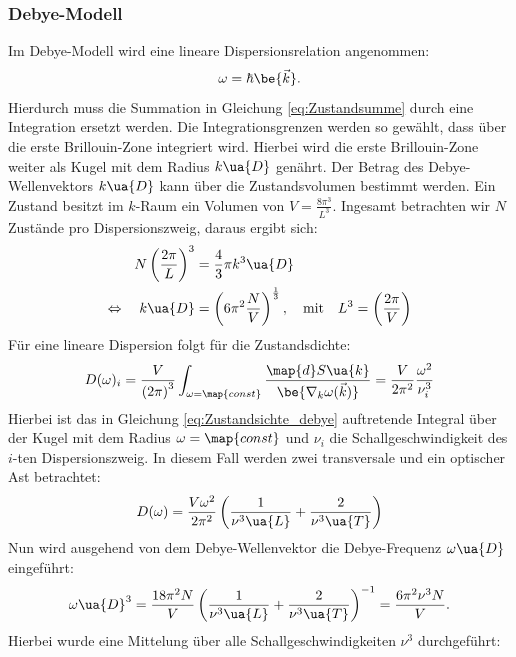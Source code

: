 \subsubsection{Debye-Modell}
Im Debye-Modell wird eine lineare Dispersionsrelation angenommen:
\begin{equation*}
   \omega = \hbar \be{\vec{k}}.
\end{equation*}
Hierdurch muss die Summation in Gleichung \eqref{eq:Zustandsumme} durch eine
Integration ersetzt werden. Die Integrationsgrenzen werden so gewählt, dass über die
erste Brillouin-Zone integriert wird. Hierbei wird die erste Brillouin-Zone
weiter als Kugel mit dem Radius $k\ua{D}$ genährt. Der Betrag des Debye-Wellenvektors
$k\ua{D}$ kann über die Zustandsvolumen bestimmt werden. Ein Zustand besitzt im $k$-Raum
ein Volumen von $V=\frac{8\pi^3}{L^3}$. Ingesamt betrachten wir $N$ Zustände pro
Dispersionszweig, daraus ergibt sich:
\begin{align*}
  N\left(\frac{2\pi}{L}\right)^3 &= \frac{4}{3}\pi k^3\ua{D} \\
  \Leftrightarrow \quad k\ua{D}&=\left(6\pi^2 \frac{N}{V}\right)^{\frac{1}{3}}, \quad \text{mit} \quad L^3 = \left(\frac{2\pi}{V}\right)
\end{align*}
Für eine lineare Dispersion folgt für die Zustandsdichte:
\begin{equation}
  \label{eq:Zustandsichte_debye}
D(\omega)_i = \frac{V}{\left(2\pi\right)^3} \int_{\omega=\map{const}} \frac{\map{d}S\ua{k}}{\be{\nabla_k \omega(\vec{k})}}= \frac{V}{2\pi^2}\frac{\omega^2}{\nu_i^3}
\end{equation}
Hierbei ist das in Gleichung \eqref{eq:Zustandsichte_debye} auftretende Integral
über der Kugel mit dem Radius $\omega=\map{const}$ und $\nu_i$ die Schallgeschwindigkeit
des $i$-ten Dispersionszweig. In diesem Fall werden zwei transversale und ein optischer
Ast betrachtet:
\begin{equation}
  \label{eq:Zustandsdichte_all_togther}
  D(\omega) = \frac{V \omega^2}{2\pi^2} \left(\frac{1}{\nu^3\ua{L}} + \frac{2}{\nu^3\ua{T}}\right)
\end{equation}
Nun wird ausgehend von dem Debye-Wellenvektor die Debye-Frequenz $\omega\ua{D}$ eingeführt:
\begin{equation}
  \label{eq:Debye_freuqenz}
  \omega\ua{D}^3 = \frac{18 \pi^2 N}{V}\left(\frac{1}{\nu^3\ua{L}} + \frac{2}{\nu^3\ua{T}}\right)^{-1}=\frac{6\pi^2\nu^3N}{V}.
\end{equation}
Hierbei wurde eine Mittelung über alle Schallgeschwindigkeiten $\nu^3$ durchgeführt:
